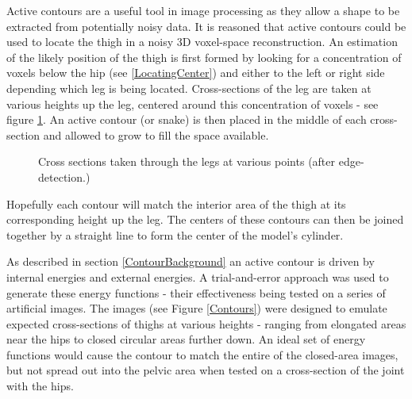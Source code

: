 Active contours are a useful tool in image processing as they allow a shape to be extracted from potentially noisy data.
It is reasoned that active contours could be used to locate the thigh in a noisy 3D voxel-space reconstruction.
An estimation of the likely position of the thigh is first formed by looking for a concentration of voxels below the hip
(see \ref{LocatingCenter}) and either to the left or right side depending which leg is being located.
Cross-sections of the leg are taken at various heights up the leg, centered around this concentration of voxels - see figure \ref{CrossSections}.
An active contour (or snake) is then placed in the middle of each cross-section and allowed to grow to fill the space available.

\begin{figure}[tb]
	\vspace{-10pt}
	\centering
	\quad
	\caption{Cross sections taken through the legs at various points (after edge-detection.)}
	\label{CrossSections}
\end{figure}

Hopefully each contour will match the interior area of the thigh at its corresponding height up the leg.
The centers of these contours can then be joined together by a straight line to form the center of the model's cylinder.

As described in section \ref{ContourBackground} an active contour is driven by internal energies and external energies.
A trial-and-error approach was used to generate these energy functions - their effectiveness being tested on a series of artificial images.
The images (see Figure \ref{Contours}) were designed to emulate expected cross-sections of thighs at various heights - ranging from elongated areas
near the hips to closed circular areas further down.
An ideal set of energy functions would cause the contour to match the entire of the closed-area images, but not spread out into
the pelvic area when tested on a cross-section of the joint with the hips.

